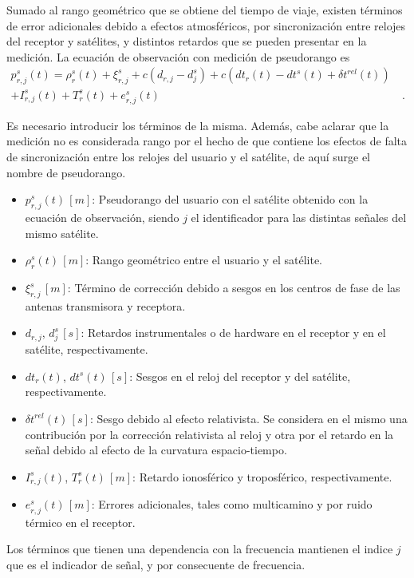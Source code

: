 \documentclass[a4paper,12pt,oneside,onecolumn,final,openright]{book}%
\begin{document}
	Sumado al rango geométrico que se obtiene del tiempo de viaje, existen términos de error adicionales debido a efectos atmosféricos, por sincronización entre relojes del receptor y satélites, y distintos retardos que se pueden presentar en la medición. La ecuación de observación con medición de pseudorango es 
\begin{align}\label{ec:obs_pseudorango}
	p_{r,j}^s(t) = \rho_r^s(t) + \xi_{r,j}^s + c\left(d_{r,j}-d_j^s\right) + c\left(dt_r(t)-dt^s(t)+\delta t^{rel}(t)\right)& \\ 
	+ I_{r,j}^s(t) + T_r^s(t) +e_{r,j}^s(t)& \ . \nonumber
\end{align}

	Es necesario introducir los términos de la misma. Además, cabe aclarar que la medición no es considerada rango por el hecho de que contiene los efectos de falta de sincronización entre los relojes del usuario y el satélite, de aquí surge el nombre de pseudorango. 
\begin{itemize}
	\item $p_{r,j}^s(t)\,[m]$: Pseudorango del usuario con el satélite obtenido con la ecuación de observación, siendo $j$ el identificador para las distintas señales del mismo satélite.
	\item $\rho_r^s(t)\,[m]$: Rango geométrico entre el usuario y el satélite.
	\item $\xi_{r,j}^s\,[m]$: Término de corrección debido a sesgos en los centros de fase de las antenas transmisora y receptora.
	\item $d_{r,j}$, $d_j^s\,[s]$: Retardos instrumentales o de hardware en el receptor y en el satélite, respectivamente.
	\item $dt_r(t)$, $dt^s(t)\,[s]$: Sesgos en el reloj del receptor y del satélite, respectivamente.
	\item $\delta t^{rel}(t)\,[s]$: Sesgo debido al efecto relativista. Se considera en el mismo una contribución por la corrección relativista al reloj y otra por el retardo en la señal debido al efecto de la curvatura espacio-tiempo.
	\item $I_{r,j}^s(t)$, $T_r^s(t)\,[m]$: Retardo ionosférico y troposférico, respectivamente.
	\item $e_{r,j}^s(t)\,[m]$: Errores adicionales, tales como multicamino y por ruido térmico en el receptor.
\end{itemize}
	Los términos que tienen una dependencia con la frecuencia mantienen el indice $j$ que es el indicador de señal, y por consecuente de frecuencia.
\end{document}
